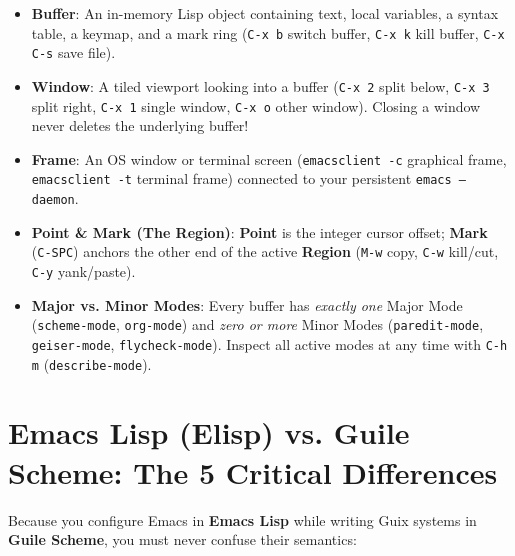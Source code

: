 \documentclass[11pt,oneside]{book}
\begin{document}
\begin{itemize}[leftmargin=1.5em]
  \item \textbf{Buffer}: An in-memory Lisp object containing text, local variables, a syntax table, a keymap, and a mark ring (\texttt{C-x b} switch buffer, \texttt{C-x k} kill buffer, \texttt{C-x C-s} save file).
  \item \textbf{Window}: A tiled viewport looking into a buffer (\texttt{C-x 2} split below, \texttt{C-x 3} split right, \texttt{C-x 1} single window, \texttt{C-x o} other window). Closing a window never deletes the underlying buffer!
  \item \textbf{Frame}: An OS window or terminal screen (\texttt{emacsclient -c} graphical frame, \texttt{emacsclient -t} terminal frame) connected to your persistent \texttt{emacs --daemon}.
  \item \textbf{Point \& Mark (The Region)}: \textbf{Point} is the integer cursor offset; \textbf{Mark} (\texttt{C-SPC}) anchors the other end of the active \textbf{Region} (\texttt{M-w} copy, \texttt{C-w} kill/cut, \texttt{C-y} yank/paste).
  \item \textbf{Major vs. Minor Modes}: Every buffer has \emph{exactly one} Major Mode (\texttt{scheme-mode}, \texttt{org-mode}) and \emph{zero or more} Minor Modes (\texttt{paredit-mode}, \texttt{geiser-mode}, \texttt{flycheck-mode}). Inspect all active modes at any time with \texttt{C-h m} (\texttt{describe-mode}).
\end{itemize}

\section{Emacs Lisp (Elisp) vs. Guile Scheme: The 5 Critical Differences}

Because you configure Emacs in \textbf{Emacs Lisp} while writing Guix systems in \textbf{Guile Scheme}, you must never confuse their semantics:
\end{document}
